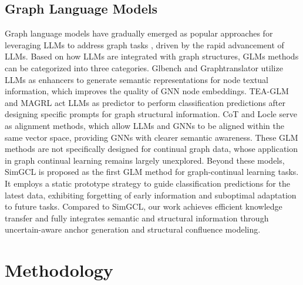 \documentclass[sigconf]{acmart}
\begin{document}
\subsection{Graph Language Models}
Graph language models have gradually emerged as popular approaches for leveraging LLMs to address graph tasks \cite{BERT,Roberta,llama,Llaga}, driven by the rapid advancement of LLMs.
Based on how LLMs are integrated with graph structures, GLMs methods can be categorized into three categories.
Glbench \cite{Glbench} and Graphtranslator \cite{Graphtranslator} utilize LLMs as enhancers to generate semantic representations for node textual information, which improves the quality of GNN node embeddings.
TEA-GLM \cite{TEA-GLM} and MAGRL \cite{MAGRL} act LLMs as predictor to perform classification predictions after designing specific prompts for graph structural information.
CoT \cite{CoT} and Locle \cite{Locle} serve as alignment methods, which allow LLMs and GNNs to be aligned within the same vector space, providing GNNs with clearer semantic awareness.
These GLM methods are not specifically designed for continual graph data, whose application in graph continual learning remains largely unexplored.
Beyond these models, SimGCL \cite{SimGCL} is proposed as the first GLM method for graph-continual learning tasks. 
It employs a static prototype strategy to guide classification predictions for the latest data, exhibiting forgetting of early information and suboptimal adaptation to future tasks.
Compared to SimGCL, our work achieves efficient knowledge transfer and fully integrates semantic and structural information through uncertain-aware anchor generation and structural confluence modeling.





\section{Methodology}
\end{document}
